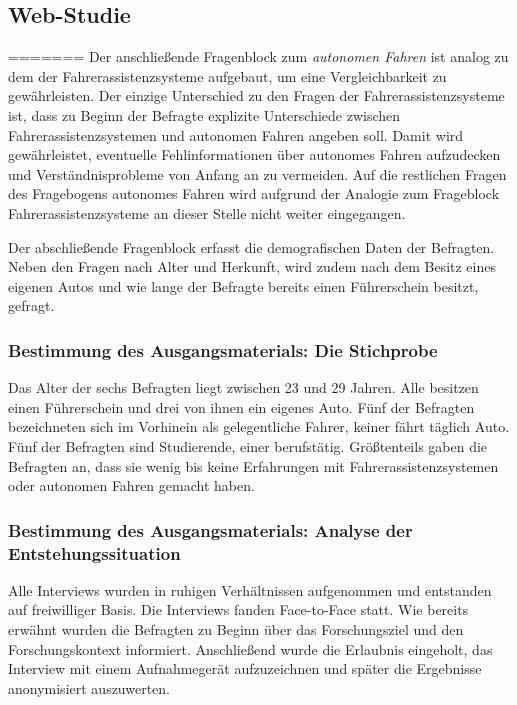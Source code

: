\documentclass[12pt]{article}
\begin{document}
\subsection{Web-Studie}
=======
Der anschließende Fragenblock zum \emph{autonomen Fahren} ist analog zu dem der Fahrerassistenzsysteme aufgebaut, um eine Vergleichbarkeit zu gewährleisten. Der einzige Unterschied zu den Fragen der Fahrerassistenzsysteme ist, dass zu Beginn der Befragte explizite Unterschiede zwischen Fahrerassistenzsystemen und autonomen Fahren angeben soll. Damit wird gewährleistet, eventuelle Fehlinformationen über autonomes Fahren aufzudecken und Verständnisprobleme von Anfang an zu vermeiden. Auf die restlichen Fragen des Fragebogens autonomes Fahren wird aufgrund der Analogie zum Frageblock Fahrerassistenzsysteme an dieser Stelle nicht weiter eingegangen.

Der abschließende Fragenblock erfasst die demografischen Daten der Befragten. Neben den Fragen nach Alter und Herkunft, wird zudem nach dem Besitz eines eigenen Autos und wie lange der Befragte bereits einen Führerschein besitzt, gefragt.

\subsubsection*{Bestimmung des Ausgangsmaterials: Die Stichprobe}
Das Alter der sechs Befragten liegt zwischen 23 und 29 Jahren. Alle besitzen einen Führerschein und drei von ihnen ein eigenes Auto. Fünf der Befragten bezeichneten sich im Vorhinein als gelegentliche Fahrer, keiner fährt täglich Auto. Fünf der Befragten sind Studierende, einer berufstätig. Größtenteils gaben die Befragten an, dass sie wenig bis keine Erfahrungen mit Fahrerassistenzsystemen oder autonomen Fahren gemacht haben.

\subsubsection*{Bestimmung des Ausgangsmaterials: Analyse der Entstehungssituation}
Alle Interviews wurden in ruhigen Verhältnissen aufgenommen und entstanden auf freiwilliger Basis. Die Interviews fanden Face-to-Face statt. Wie bereits erwähnt wurden die Befragten zu Beginn über das Forschungsziel und den Forschungskontext informiert. Anschließend wurde die Erlaubnis eingeholt, das Interview mit einem Aufnahmegerät aufzuzeichnen und später die Ergebnisse anonymisiert auszuwerten.
\end{document}
